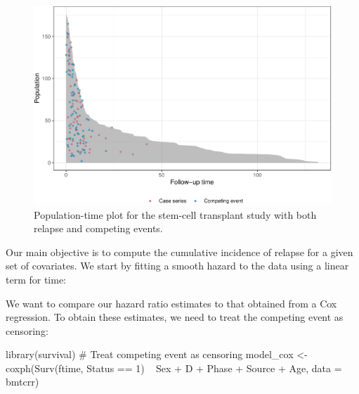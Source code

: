 \begin{Schunk}
\begin{figure}[ht]
\includegraphics[width=\textwidth,keepaspectratio=true]{../figures/compPop-1} \caption[Population-time plot for the stem-cell transplant study with both relapse and competing events]{Population-time plot for the stem-cell transplant study with both relapse and competing events.}\label{fig:compPop}
\end{figure}
\end{Schunk}

Our main objective is to compute the cumulative incidence of relapse for
a given set of covariates. We start by fitting a smooth hazard to the
data using a linear term for time:

We want to compare our hazard ratio estimates to that obtained from a
Cox regression. To obtain these estimates, we need to treat the
competing event as censoring:

\begin{Schunk}
\begin{Sinput}
library(survival)
# Treat competing event as censoring
model_cox <- coxph(Surv(ftime, Status == 1) ~ Sex + D + Phase + Source + Age,
                   data = bmtcrr)
\end{Sinput}
\end{Schunk}

